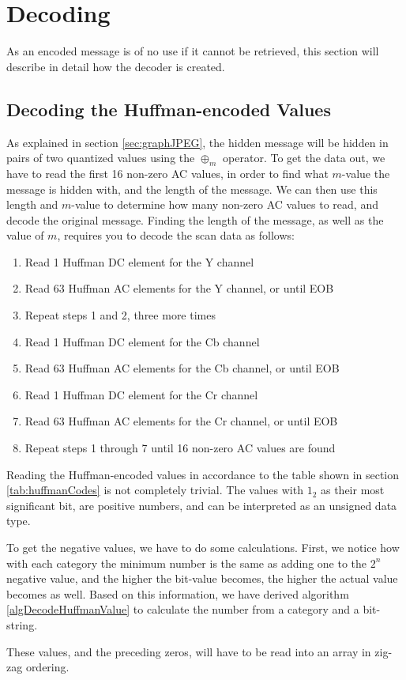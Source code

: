 \section{Decoding}
As an encoded message is of no use if it cannot be retrieved, this section will describe in detail how the decoder is created.



\subsection{Decoding the Huffman-encoded Values}
As explained in section \ref{sec:graphJPEG}, the hidden message will be hidden in pairs of two quantized values using the $\oplus_m$ operator.
To get the data out, we have to read the first 16 non-zero AC values, in order to find what $m$-value the message is hidden with, and the length of the message.
We can then use this length and $m$-value to determine how many non-zero AC values to read, and decode the original message.
Finding the length of the message, as well as the value of $m$, requires you to decode the scan data as follows:
\begin{enumerate}
	\item Read 1 Huffman DC element for the Y channel
	\item Read 63 Huffman AC elements for the Y channel, or until EOB
	\item Repeat steps 1 and 2, three more times
	\item Read 1 Huffman DC element for the Cb channel
	\item Read 63 Huffman AC elements for the Cb channel, or until EOB
	\item Read 1 Huffman DC element for the Cr channel
	\item Read 63 Huffman AC elements for the Cr channel, or until EOB
	\item Repeat steps 1 through 7 until 16 non-zero AC values are found
\end{enumerate}
Reading the Huffman-encoded values in accordance to the table shown in section \ref{tab:huffmanCodes} is not completely trivial.
The values with $1_2$ as their most significant bit, are positive numbers, and can be interpreted as an unsigned data type.

To get the negative values, we have to do some calculations. 
First, we notice how with each category the minimum number is the same as adding one to the $2^n$ negative value, and the higher the bit-value becomes, the higher the actual value becomes as well. 
Based on this information, we have derived algorithm \ref{algDecodeHuffmanValue} to calculate the number from a category and a bit-string.

These values, and the preceding zeros, will have to be read into an array in zig-zag ordering.

